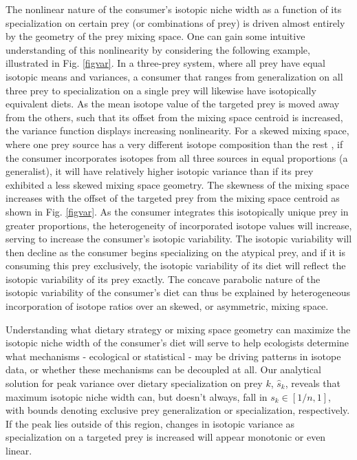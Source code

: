 \documentclass{frontiersSCNS}
\begin{document}
The nonlinear nature of the consumer's isotopic niche width as a function of its specialization on certain prey (or combinations of prey) is driven almost entirely by the geometry of the prey mixing space.
One can gain some intuitive understanding of this nonlinearity by considering the following example, illustrated in Fig. \ref{figvar}.
In a three-prey system, where all prey have equal isotopic means and variances, a consumer that ranges from generalization on all three prey to specialization on a single prey will likewise have isotopically equivalent diets.
As the mean isotope value of the targeted prey is moved away from the others, such that its offset from the mixing space centroid \citep[the center of the mixing space;][]{Layman:2007vi,Newsome:WhhVfocb} is increased, the variance function displays increasing nonlinearity.
For a skewed mixing space, where one prey source has a very different isotope composition than the rest \citep[e.g. a mixing space consisting of terrestrial foods vs. a marine subsidy;][]{Newsome:2004p992}, if the consumer incorporates isotopes from all three sources in equal proportions (a generalist), it will have relatively higher isotopic variance than if its prey exhibited a less skewed mixing space geometry.
The skewness of the mixing space increases with the offset of the targeted prey from the mixing space centroid as shown in Fig. \ref{figvar}.
As the consumer integrates this isotopically unique prey in greater proportions, the heterogeneity of incorporated isotope values will increase, serving to increase the consumer's isotopic variability.
The isotopic variability will then decline as the consumer begins specializing on the atypical prey, and if it is consuming this prey exclusively, the isotopic variability of its diet will reflect the isotopic variability of its prey exactly.
The concave parabolic nature of the isotopic variability of the consumer's diet can thus be explained by heterogeneous incorporation of isotope ratios over an skewed, or asymmetric, mixing space.


Understanding what dietary strategy or mixing space geometry can maximize the isotopic niche width of the consumer's diet will serve to help ecologists determine what mechanisms - ecological or statistical - may be driving patterns in isotope data, or whether these mechanisms can be decoupled at all.
Our analytical solution for peak variance over dietary specialization on prey $k$, $\hat s_k$, reveals that maximum isotopic niche width can, but doesn't always, fall in $s_k \in [1/n,1]$, with bounds denoting exclusive prey generalization or specialization, respectively.
If the peak lies outside of this region, changes in isotopic variance as specialization on a targeted prey is increased will appear monotonic or even linear.
\end{document}
